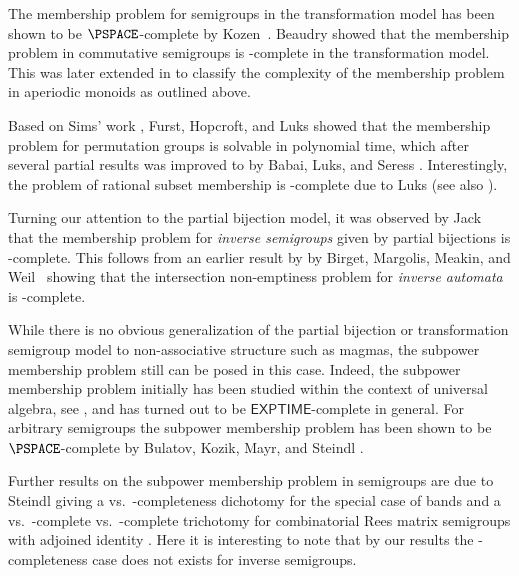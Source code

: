 
The membership problem for semigroups in the transformation model has been shown to be $\PSPACE$-complete by Kozen~\cite{koz77}.
Beaudry \cite{Beaudry88} showed that the membership problem in commutative semigroups is \NP-complete in the transformation model.
This was later extended in \cite{Beaudry88thesis,BeaudryMT92} to classify the complexity of the membership problem in aperiodic monoids as outlined above.

Based on Sims' work \cite{Sims67}, Furst, Hopcroft, and Luks \cite{FurstHopcroftLuks80} showed that the membership problem for permutation groups is solvable in polynomial time, which after several partial results \cite{LuksM88,Luks86,McKenzieC87} was improved to \NC by Babai, Luks, and Seress \cite{BabaiLS87}.
Interestingly, the problem of rational subset membership is \NP-complete due to Luks \cite{Luks93} (see also \cite{LohreyRZ22}).

Turning our attention to the partial bijection model, it was observed by Jack~\cite{Jack23} that the membership problem for \emph{inverse semigroups} given by partial bijections is \PSPACE-complete.
This follows from an earlier result by by Birget, Margolis, Meakin, and Weil~\cite{BirgetMMW94} showing that the intersection non-emptiness problem for \emph{inverse automata} is \PSPACE-complete.

While there is no obvious generalization of the partial bijection or transformation semigroup model to non-associative structure such as magmas, the subpower membership problem still can be posed in this case.
Indeed, the subpower membership problem initially has been studied within the context of universal algebra, see \eg \cite{Mayr12,BulatovMS19,Kompatscher24}, and has turned out to be $\mathsf{EXPTIME}$-complete \cite{Kozik08} in general.
For arbitrary semi\-groups the subpower membership problem has been shown to be $\PSPACE$-complete by Bulatov, Kozik, Mayr, and Steindl \cite{BulatovKMS16}.

Further results on the subpower membership problem in semigroups are due to Steindl giving a \Ptime vs.\ \NP-completeness dichotomy for the special case of bands \cite{Steindl17} and a \Ptime vs.\ \NP-complete vs.\ \PSPACE-complete trichotomy for combinatorial Rees matrix semigroups with adjoined identity
\cite{Steindl19}. 
Here it is interesting to note that by our results the \NP-completeness case does not exists for inverse semigroups.

